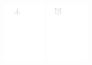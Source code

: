     \begin{center}
        \includegraphics[width=0.16\textwidth]{figure4_1.pdf}
        \hspace{3cm}
        \includegraphics[width=0.16\textwidth]{figure4_2.pdf}
    \end{center}

